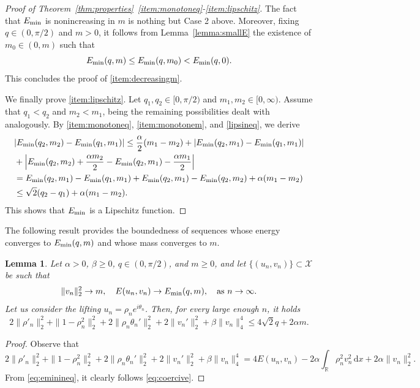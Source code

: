\documentclass[11pt]{article}
\newcommand{\R}{\mathbb{R}}
\newcommand{\boX}{\mathcal{X}}
\newcommand{\Emin}{E_\textup{min}}
\renewcommand{\d}{\,\mathrm{d}}
\theoremstyle{plain}
\newtheorem{lemma}[theorem]{Lemma}
\theoremstyle{definition}
\theoremstyle{remark}
\numberwithin{equation}{section}
\begin{document}
{\begin{proof}[Proof of Theorem~\ref{thm:properties}~\ref{item:monotoneq}-\ref{item:lipschitz}]
The fact that $\Emin$ is nonincreasing in $m$ is nothing but Case 2 above. Moreover, fixing $q\in(0,\pi/2)$ and $m>0$, it follows from Lemma~\ref{lemma:smallE} the existence of $m_0\in (0,m)$ such that
\[\Emin(q,m)\leq\Emin(q,m_0)<\Emin(q,0).\]
This concludes the proof of \ref{item:decreasingm}.

We finally prove \ref{item:lipschitz}. Let $q_1,q_2\in [0,\pi/2)$ and $m_1,m_2\in [0,\infty)$. Assume that $q_1<q_2$ and $m_2<m_1$, being the remaining possibilities dealt with analogously. By \ref{item:monotoneq}, \ref{item:monotonem}, and \eqref{lipsineq}, we derive
\begin{align*}
&|\Emin(q_2,m_2) -\Emin(q_1,m_1)|\leq \frac{\alpha}{2}(m_1-m_2)+|\Emin(q_2,m_1)-\Emin(q_1,m_1)|
\\
&+\Big|\Emin(q_2,m_2)+\frac{\alpha m_2}{2}-\Emin(q_2,m_1)-\frac{\alpha m_1}{2}\Big|
\\
&= \Emin(q_2,m_1)-\Emin(q_1,m_1)+\Emin(q_2,m_1)-\Emin(q_2,m_2)+\alpha(m_1-m_2)
\\
&\leq\sqrt{2}(q_2-q_1)+\alpha(m_1-m_2).
\end{align*}
This shows that $\Emin$ is a Lipschitz function. 
\end{proof}




The following result provides the boundedness of sequences whose energy converges to $\Emin(q,m)$ and whose mass converges to $m$.

\begin{lemma}\label{lemma:energybounded}
    Let $\alpha>0$, $\beta\geq 0$, $q\in(0,\pi/2)$, and $m\geq 0$, and let $\{(u_n,v_n)\}\subset \boX$ be such that    \begin{equation}\label{eq:almostminimizingseq}
        \|v_n\|_2^2\to m,\quad E(u_n,v_n)\to\Emin(q,m),\quad\text{as }n\to\infty.
    \end{equation}
    Let us consider the lifting $u_n=\rho_n e^{i\theta_n}$. Then, for every large enough $n$, it holds     \begin{equation}\label{eq:coercive}
    2\|\rho'_n\|_{2}^2 + \|1-\rho_n^2\|_2^2 + 2\|\rho_n\theta_n'\|_2^2 + 2\|v_n'\|^2_2 + \beta\|v_n\|_4^4\leq 4\sqrt{2}q+2\alpha m.
    \end{equation}
\end{lemma}

\begin{proof}
    Observe that
    \[2\|\rho'_n\|_2^2 + \|1-\rho_n^2\|_2^2 + 2\|\rho_n\theta_n'\|_2^2 + 2\|v_n'\|^2_2 +\beta\|v_n\|_4^4=4E(u_n,v_n)-2\alpha\int_\R\rho_n^2v_n^2\d x+2\alpha \|v_n\|_2^2.\]
    From \eqref{eq:eminineq}, it clearly follows \eqref{eq:coercive}.
\end{proof}


}
\end{document}
